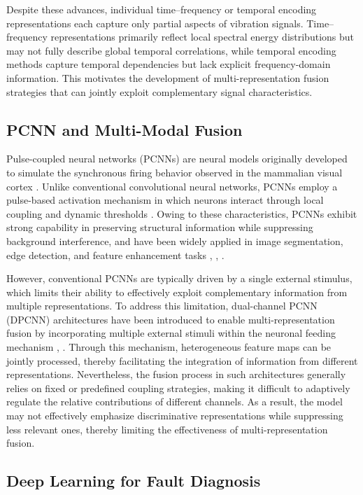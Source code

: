 \documentclass[journal]{IEEEtran}
\begin{document}
Despite these advances, individual time--frequency or temporal encoding representations each capture only partial aspects of vibration signals. Time--frequency representations primarily reflect local spectral energy distributions but may not fully describe global temporal correlations, while temporal encoding methods capture temporal dependencies but lack explicit frequency-domain information. This motivates the development of multi-representation fusion strategies that can jointly exploit complementary signal characteristics.

\subsection{PCNN and Multi-Modal Fusion}

Pulse-coupled neural networks (PCNNs) are neural models originally developed to simulate the synchronous firing behavior observed in the mammalian visual cortex \cite{4305279,6338347}. Unlike conventional convolutional neural networks, PCNNs employ a pulse-based activation mechanism in which neurons interact through local coupling and dynamic thresholds \cite{8742596}. Owing to these characteristics, PCNNs exhibit strong capability in preserving structural information while suppressing background interference, and have been widely applied in image segmentation, edge detection, and feature enhancement tasks \cite{9444355}, \cite{10848019}, \cite{8746999}. 

However, conventional PCNNs are typically driven by a single external stimulus, which limits their ability to effectively exploit complementary information from multiple representations. To address this limitation, dual-channel PCNN (DPCNN) architectures have been introduced to enable multi-representation fusion by incorporating multiple external stimuli within the neuronal feeding mechanism \cite{4344292}, \cite{10341267}. Through this mechanism, heterogeneous feature maps can be jointly processed, thereby facilitating the integration of information from different representations. Nevertheless, the fusion process in such architectures generally relies on fixed or predefined coupling strategies, making it difficult to adaptively regulate the relative contributions of different channels. As a result, the model may not effectively emphasize discriminative representations while suppressing less relevant ones, thereby limiting the effectiveness of multi-representation fusion.

\subsection{Deep Learning for Fault Diagnosis}
\end{document}
